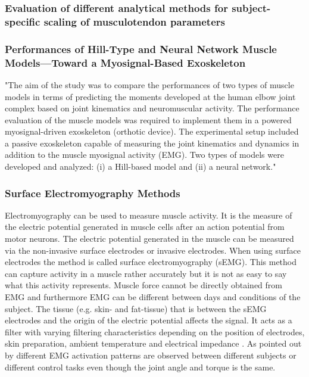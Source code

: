 \subsubsection{Evaluation of different analytical methods for subject-specific scaling of musculotendon parameters}

\subsubsection{Performances of Hill-Type and Neural Network Muscle
Models—Toward a Myosignal-Based Exoskeleton}

"The aim of the study was to compare the performances of two types of muscle models in terms of predicting the moments developed at the human elbow joint complex based on joint kinematics and neuromuscular activity. The performance evaluation of the muscle models was required to implement them in a powered myosignal-driven exoskeleton (orthotic device). The experimental setup included a passive exoskeleton capable of measuring the joint kinematics and dynamics in addition to the muscle myosignal activity (\ac{EMG}). Two types of models were developed and analyzed: (i) a Hill-based model and (ii) a neural network." \cite[p. 1]{Rosen1999}

\subsubsection{Surface Electromyography Methods}
Electromyography can be used to measure muscle activity. 
It is the measure of the electric potential generated in muscle cells after an action potential from motor neurons. 
The electric potential generated in the muscle can be measured via the non-invasive surface electrodes or invasive electrodes. 
When using surface electrodes the method is called surface electromyography (sEMG). 
This method can capture activity in a muscle rather accurately but it is not as easy to say what this activity represents. 
Muscle force cannot be directly obtained from EMG and furthermore EMG can be different between days and conditions of the subject. 
The tissue (e.g. skin- and fat-tissue) that is between the sEMG electrodes and the origin of the electric potential affects the signal. 
It acts as a filter with varying filtering characteristics depending on the position of electrodes, skin preparation, ambient temperature and electrical impedance \cite{Lloyd2003}.  
As pointed out by  different EMG activation patterns are observed between different subjects or different control tasks even though the joint angle and torque is the same.

